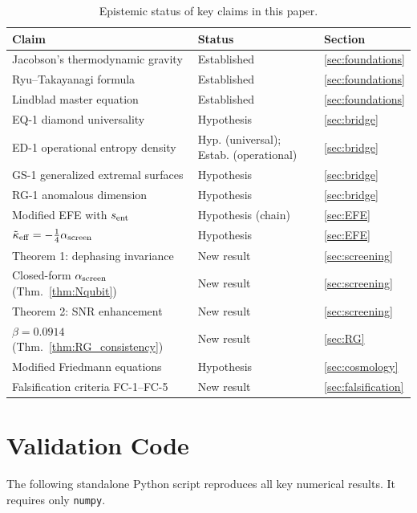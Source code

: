 \documentclass[12pt]{article}
\begin{document}
\begin{table}[ht]
\centering
\caption{Epistemic status of key claims in this paper.}
\label{tab:epistemic}
\begin{tabular}{p{5.0cm}p{2.6cm}p{1.6cm}}
\toprule
\textbf{Claim} & \textbf{Status} & \textbf{Section}\\
\midrule
Jacobson's thermodynamic gravity & Established & \ref{sec:foundations}\\
Ryu--Takayanagi formula & Established & \ref{sec:foundations}\\
Lindblad master equation & Established & \ref{sec:foundations}\\
EQ-1 diamond universality & Hypothesis & \ref{sec:bridge}\\
ED-1 operational entropy density & Hyp. (universal); Estab. (operational) & \ref{sec:bridge}\\
GS-1 generalized extremal surfaces & Hypothesis & \ref{sec:bridge}\\
RG-1 anomalous dimension & Hypothesis & \ref{sec:bridge}\\
Modified EFE with $s_{\rm ent}$ & Hypothesis (chain) & \ref{sec:EFE}\\
$\tilde{\kappa}_{\rm eff} = -\tfrac{1}{4}\alpha_{\rm screen}$ & Hypothesis & \ref{sec:EFE}\\
Theorem 1: dephasing invariance & New result & \ref{sec:screening}\\
Closed-form $\alpha_{\rm screen}$ (Thm.~\ref{thm:Nqubit}) & New result & \ref{sec:screening}\\
Theorem 2: SNR enhancement & New result & \ref{sec:screening}\\
$\beta = 0.0914$ (Thm.~\ref{thm:RG_consistency}) & New result & \ref{sec:RG}\\
Modified Friedmann equations & Hypothesis & \ref{sec:cosmology}\\
Falsification criteria FC-1--FC-5 & New result & \ref{sec:falsification}\\
\bottomrule
\end{tabular}
\end{table}

\section{Validation Code}
\label{app:code}

The following standalone Python script reproduces all key numerical results. It requires
only \texttt{numpy}.
\end{document}
